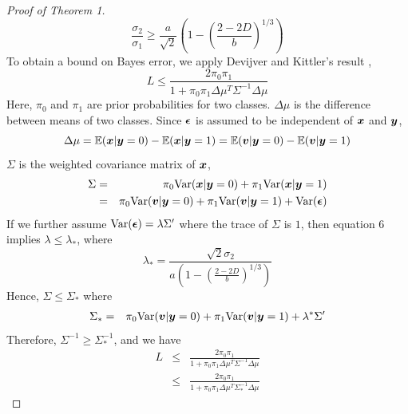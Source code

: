 \documentclass{article}
\begin{document}
\begin{proof}[Proof of Theorem 1]
	\begin{equation}
	\frac{ \sigma_2}{\sigma_1} \geq\frac{a}{\sqrt{2}} (1-(\frac{2-2D}{b})^{1/3} )
	\end{equation}	
	To obtain a bound on Bayes error, we apply Devijver and Kittler's result \cite{devijver1982pattern},
	\[L \leq \frac{2\pi_0\pi_1}{1+\pi_0\pi_1\Delta\mu^T\Sigma^{-1}\Delta\mu}\]
	Here, $\pi_0$ and $\pi_1$ are prior probabilities for two classes. $\Delta\mu$ is the difference between means of two classes. Since $\boldsymbol{\epsilon}$ is assumed to be independent of $\boldsymbol{x}$ and $\boldsymbol{y}$,
	\[\Delta\mu= \mathbb{E}(\boldsymbol{x}|\boldsymbol{y}=0)-\mathbb{E}(\boldsymbol{x}|\boldsymbol{y}=1)=\mathbb{E}(\boldsymbol{v}|\boldsymbol{y}=0)-\mathbb{E}(\boldsymbol{v}|\boldsymbol{y}=1)\]
	$\Sigma$ is the weighted covariance matrix of $\boldsymbol{x}$,
	\begin{eqnarray*}
		\Sigma &=& \pi_0\text{Var}(\boldsymbol{x}|\boldsymbol{y}=0)+\pi_1\text{Var}(\boldsymbol{x}|\boldsymbol{y}=1)\\
		&=& \pi_0\text{Var}(\boldsymbol{v}|\boldsymbol{y}=0)+\pi_1\text{Var}(\boldsymbol{v}|\boldsymbol{y}=1)+\text{Var}(\boldsymbol{\epsilon}) \\ 
	\end{eqnarray*}
	If we further assume $\text{Var}(\boldsymbol{\epsilon}) = \lambda \Sigma'$ where the trace of $\Sigma$ is $1$, then equation 6 implies $\lambda\leq\lambda_*$, where
	\[\lambda_*=\frac{\sqrt{2}\sigma_2}{a(1-(\frac{2-2D}{b})^{1/3} )}\]
	Hence, 	$\Sigma \leq \Sigma_*$ where
	\begin{eqnarray*}
		\Sigma_*&=& \pi_0\text{Var}(\boldsymbol{v}|\boldsymbol{y}=0)+\pi_1\text{Var}(\boldsymbol{v}|\boldsymbol{y}=1)+\lambda^*\Sigma'
	\end{eqnarray*}
	Therefore, $\Sigma^{-1} \geq \Sigma_*^{-1}$, and we have
	\begin{eqnarray*}
		L &\leq& \frac{2\pi_0\pi_1}{1+\pi_0\pi_1\Delta\mu^T\Sigma^{-1}\Delta\mu} \\
		&\leq& \frac{2\pi_0\pi_1}{1+\pi_0\pi_1\Delta\mu^T\Sigma_*^{-1}\Delta\mu}
	\end{eqnarray*}
\end{proof}
\end{document}
